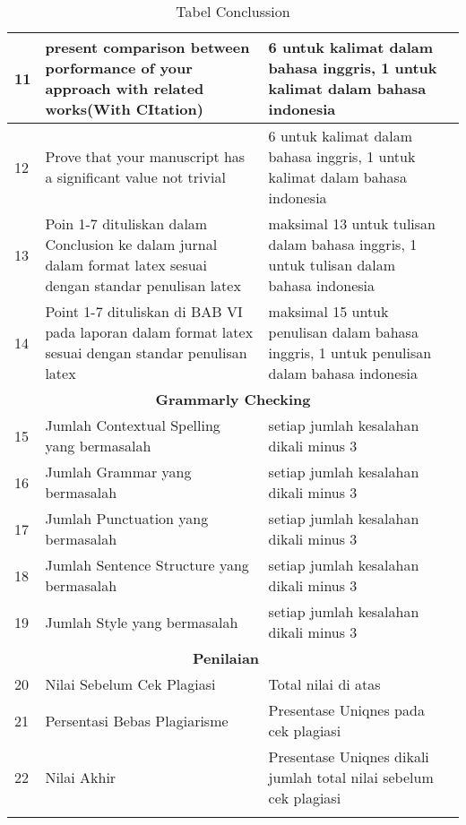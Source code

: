 \begin{longtable}{|p{}|p{}|p{}|p{}|}
11 &present comparison between porformance of your approach with related works(With CItation) & 6 untuk kalimat dalam bahasa inggris, 1 untuk kalimat dalam bahasa indonesia & \\ \hline

12 &Prove that your manuscript has a significant value not trivial & 6 untuk kalimat dalam bahasa inggris, 1 untuk kalimat dalam bahasa indonesia & \\ \hline

13 &Poin 1-7 dituliskan dalam Conclusion ke dalam jurnal dalam format latex sesuai dengan standar penulisan latex & maksimal 13 untuk tulisan dalam bahasa inggris, 1 untuk tulisan dalam bahasa indonesia & \\ \hline

14 &Point 1-7 dituliskan di BAB VI pada laporan dalam format latex sesuai dengan standar penulisan latex & maksimal 15 untuk penulisan dalam bahasa inggris, 1 untuk penulisan dalam bahasa indonesia & \\ \hline


\multicolumn{4}{c}{\textbf{Grammarly Checking}}\\ \hline

15 &Jumlah Contextual Spelling yang bermasalah&setiap jumlah kesalahan dikali minus 3& \\ \hline

16 &Jumlah Grammar yang bermasalah&setiap jumlah kesalahan dikali minus 3& \\ \hline

17 &Jumlah Punctuation yang bermasalah&setiap jumlah kesalahan dikali minus 3& \\ \hline

18 &Jumlah Sentence Structure yang bermasalah&setiap jumlah kesalahan dikali minus 3& \\ \hline

19 &Jumlah Style yang bermasalah&setiap jumlah kesalahan dikali minus 3& \\ \hline

\multicolumn{3}{c}{\textbf{Penilaian}}\\ \hline

20 &Nilai Sebelum Cek Plagiasi&Total nilai di atas& \\ \hline

21 &Persentasi Bebas Plagiarisme&Presentase Uniqnes pada cek plagiasi& \\ \hline

22 &Nilai Akhir&Presentase Uniqnes dikali jumlah total nilai sebelum cek plagiasi& \\ \hline

\caption{Tabel Conclussion}
\label{table:conclussion}
\end{longtable}


